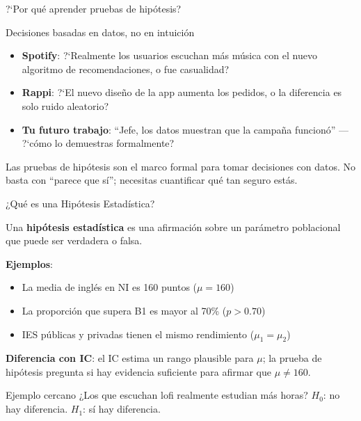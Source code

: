 \documentclass[aspectratio=169, 11pt]{beamer}
\begin{document}
\begin{frame}{?`Por qu\'e aprender pruebas de hip\'otesis?}
\small
\begin{exampleblock}{Decisiones basadas en datos, no en intuici\'on}
\begin{itemize}\setlength{\itemsep}{2pt}
  \item \textbf{Spotify}: ?`Realmente los usuarios escuchan m\'as m\'usica con el nuevo algoritmo de recomendaciones, o fue casualidad?
  \item \textbf{Rappi}: ?`El nuevo dise\~no de la app aumenta los pedidos, o la diferencia es solo ruido aleatorio?
  \item \textbf{Tu futuro trabajo}: ``Jefe, los datos muestran que la campa\~na funcion\'o'' --- ?`c\'omo lo demuestras formalmente?
\end{itemize}
\end{exampleblock}

\vspace{0.2cm}
Las pruebas de hip\'otesis son el marco formal para tomar \alert{decisiones} con datos. No basta con ``parece que s\'i''; necesitas cuantificar qu\'e tan seguro est\'as.
\end{frame}

\begin{frame}{¿Qué es una Hipótesis Estadística?}
\begin{definition}
Una \textbf{hipótesis estadística} es una afirmación sobre un parámetro poblacional que puede ser verdadera o falsa.
\end{definition}

\vspace{0.2cm}
\textbf{Ejemplos}:
\begin{itemize}
  \item La media de ingl\'es en NI es 160 puntos ($\mu = 160$)
  \item La proporci\'on que supera B1 es mayor al 70\% ($p > 0.70$)
  \item IES p\'ublicas y privadas tienen el mismo rendimiento ($\mu_1 = \mu_2$)
\end{itemize}

\vspace{0.1cm}
\textbf{Diferencia con IC}: el IC estima un rango plausible para $\mu$; la prueba de hip\'otesis pregunta si hay evidencia suficiente para afirmar que $\mu \neq 160$.

\begin{exampleblock}{Ejemplo cercano}
¿Los que escuchan lofi realmente estudian m\'as horas? $H_0$: no hay diferencia. $H_1$: s\'i hay diferencia.
\end{exampleblock}
\end{frame}
\end{document}
